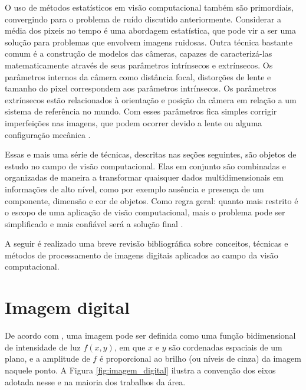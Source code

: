 O uso de métodos estatísticos em visão computacional também são primordiais, convergindo para o problema de ruído discutido anteriormente. Considerar a média dos pixeis no tempo é uma abordagem estatística, que pode vir a ser uma solução para problemas que envolvem imagens ruidosas. Outra técnica bastante comum é a construção de modelos das câmeras, capazes de caracterizá-las matematicamente através de seus parâmetros intrínsecos e extrínsecos. Os parâmetros internos da câmera como distância focal, distorções de lente e tamanho do pixel correspondem aos parâmetros intrínsecos. Os parâmetros extrínsecos estão relacionados à orientação e posição da câmera em relação a um sistema de referência no mundo. Com esses parâmetros fica simples corrigir imperfeições nas imagens, que podem ocorrer devido a lente ou alguma configuração mecânica \citep{opencv:2008:book}.

Essas e mais uma série de técnicas, descritas nas seções seguintes, são objetos de estudo no campo de visão computacional. Elas em conjunto são combinadas e organizadas de maneira a transformar quaisquer dados multidimensionais em informações de alto nível, como por exemplo ausência e presença de um componente, dimensão e cor de objetos. Como regra geral: quanto mais restrito é o escopo de uma aplicação de visão computacional, mais o problema pode ser simplificado e mais confiável será a solução final \citep{opencv:2008:book}.

A seguir é realizado uma breve revisão bibliográfica sobre conceitos, técnicas e métodos de processamento de imagens digitais aplicados ao campo da visão computacional.

\section{Imagem digital} %
\label{sec:imagem_digital}

De acordo com \cite{woods:2000:book}, uma imagem pode ser definida como uma função bidimensional de intensidade de luz $f(x,y)$, em que $x$ e $y$ são cordenadas espaciais de um plano, e a amplitude de $f$ é proporcional ao brilho (ou níveis de cinza) da imagem naquele ponto. A Figura \ref{fig:imagem_digital} ilustra a convenção dos eixos adotada nesse e na maioria dos trabalhos da área.

